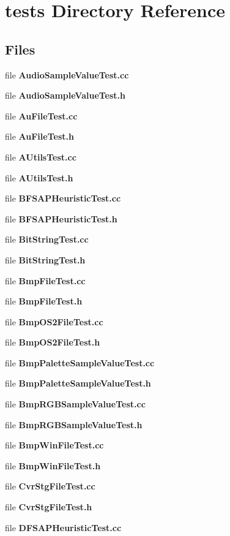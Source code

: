 \section{tests Directory Reference}
\label{dir_59425e443f801f1f2fd8bbe4959a3ccf}
\subsection*{Files}
\begin{DoxyCompactItemize}
\item 
file \textbf{ Audio\+Sample\+Value\+Test.\+cc}
\item 
file \textbf{ Audio\+Sample\+Value\+Test.\+h}
\item 
file \textbf{ Au\+File\+Test.\+cc}
\item 
file \textbf{ Au\+File\+Test.\+h}
\item 
file \textbf{ A\+Utils\+Test.\+cc}
\item 
file \textbf{ A\+Utils\+Test.\+h}
\item 
file \textbf{ B\+F\+S\+A\+P\+Heuristic\+Test.\+cc}
\item 
file \textbf{ B\+F\+S\+A\+P\+Heuristic\+Test.\+h}
\item 
file \textbf{ Bit\+String\+Test.\+cc}
\item 
file \textbf{ Bit\+String\+Test.\+h}
\item 
file \textbf{ Bmp\+File\+Test.\+cc}
\item 
file \textbf{ Bmp\+File\+Test.\+h}
\item 
file \textbf{ Bmp\+O\+S2\+File\+Test.\+cc}
\item 
file \textbf{ Bmp\+O\+S2\+File\+Test.\+h}
\item 
file \textbf{ Bmp\+Palette\+Sample\+Value\+Test.\+cc}
\item 
file \textbf{ Bmp\+Palette\+Sample\+Value\+Test.\+h}
\item 
file \textbf{ Bmp\+R\+G\+B\+Sample\+Value\+Test.\+cc}
\item 
file \textbf{ Bmp\+R\+G\+B\+Sample\+Value\+Test.\+h}
\item 
file \textbf{ Bmp\+Win\+File\+Test.\+cc}
\item 
file \textbf{ Bmp\+Win\+File\+Test.\+h}
\item 
file \textbf{ Cvr\+Stg\+File\+Test.\+cc}
\item 
file \textbf{ Cvr\+Stg\+File\+Test.\+h}
\item 
file \textbf{ D\+F\+S\+A\+P\+Heuristic\+Test.\+cc}

\end{DoxyCompactItemize}
